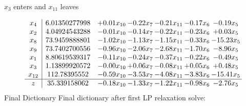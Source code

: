 \documentclass[8pt]{article}
\begin{document}
 $ x_{3} $ enters and $ x_{11} $ leaves 

 \[\begin{array}{c| c c@{\hskip 2pt} c@{\hskip 2pt} c@{\hskip 2pt} c@{\hskip 2pt} c@{\hskip 2pt} }
 x_{4}   &  6.01350277998 & +  0.01 x_{10} & -0.22 x_{7} & -0.21 x_{11} & -0.17 x_{6} & -0.19 x_{5}\\
 x_{2}   &  4.04924543288 & -0.01 x_{10} & -0.14 x_{7} & -0.22 x_{11} & -0.23 x_{6} & +  0.03 x_{5}\\
 x_{8}   &  73.9459888801 & -1.02 x_{10} & -1.13 x_{7} & -1.15 x_{11} & -0.33 x_{6} & -15.23 x_{5}\\
 x_{9}   &  73.7402700556 & -0.96 x_{10} & -2.06 x_{7} & -2.68 x_{11} & -1.70 x_{6} & -8.96 x_{5}\\
 x_{1}   &  8.80619539317 & -0.11 x_{10} & -0.24 x_{7} & -0.37 x_{11} & -0.22 x_{6} & -0.49 x_{5}\\
 x_{3}   &  1.13899920572 & -0.00 x_{10} & +  0.06 x_{7} & -0.08 x_{11} & +  0.05 x_{6} & +  0.48 x_{5}\\
 x_{12}   &  112.78395552 & -0.59 x_{10} & -3.53 x_{7} & -4.08 x_{11} & -3.83 x_{6} & -15.41 x_{5}\\
\hline
z    &  35.339158062 & -0.18 x_{10} & -1.33 x_{7} & -1.22 x_{11} & -0.98 x_{6} & -2.76 x_{5}\\
\end{array}\]
Final Dictionary
Final dictionary after first LP relaxation solve: 
\end{document}
